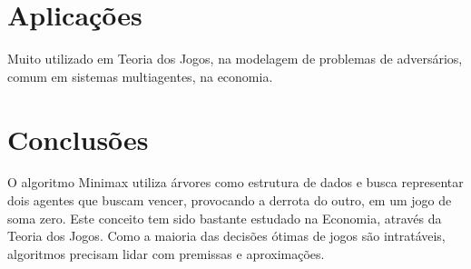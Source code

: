 \documentclass[sigplan,screen]{acmart}
\begin{document}
\section{Aplicações}
Muito utilizado em Teoria dos Jogos, na modelagem de problemas de adversários, comum em sistemas multiagentes, na economia.

\section{Conclusões}
O algoritmo Minimax utiliza árvores como estrutura de dados e busca representar dois agentes que buscam vencer, provocando a derrota do outro, em um jogo de soma zero. 
Este conceito tem sido bastante estudado na Economia, através da Teoria dos Jogos. Como a maioria das decisões ótimas de jogos são intratáveis, algoritmos precisam lidar com premissas e aproximações.



\end{document}
